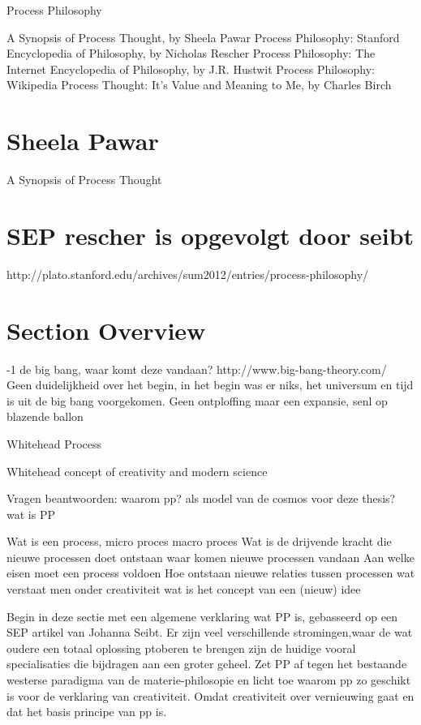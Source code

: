 \documentclass[a4paper]{Thesis}
\begin{document}
Process Philosophy

A Synopsis of Process Thought, by Sheela Pawar
Process Philosophy: Stanford Encyclopedia of Philosophy, by Nicholas Rescher
Process Philosophy: The Internet Encyclopedia of Philosophy, by J.R. Hustwit
Process Philosophy: Wikipedia
Process Thought: It's Value and Meaning to Me, by Charles Birch


\section{Sheela Pawar}
A Synopsis of Process Thought


\section{SEP rescher is opgevolgt door seibt}
http://plato.stanford.edu/archives/sum2012/entries/process-philosophy/

\section{Section Overview}

-1 de big bang, waar komt deze vandaan?
	http://www.big-bang-theory.com/
		Geen duidelijkheid over het begin, in het begin was er niks, het universum en tijd is uit de big bang voorgekomen.
		Geen ontploffing maar een expansie, senl op blazende ballon
	
Whitehead
	Process

Whitehead concept of creativity and modern science
 	



Vragen beantwoorden:
	waarom pp? als model van de cosmos voor deze thesis?
	wat is PP
	
	Wat is een process, micro proces macro proces
	Wat is de drijvende kracht die nieuwe processen doet ontstaan
	waar komen nieuwe processen vandaan
	Aan welke eisen moet een process voldoen
	Hoe ontstaan nieuwe relaties tussen processen
	wat verstaat men onder creativiteit
	wat is het concept van een (nieuw) idee

Begin in deze sectie met een algemene verklaring wat PP is, gebasseerd op een SEP artikel van Johanna Seibt. Er zijn veel verschillende stromingen,waar de wat oudere een totaal oplossing ptoberen te brengen zijn de huidige vooral specialisaties die bijdragen aan een groter geheel.
Zet PP af tegen het bestaande westerse paradigma van de materie-philosopie en licht toe waarom pp zo geschikt is voor de verklaring van creativiteit. Omdat creativiteit over vernieuwing gaat en dat het basis principe van pp is.
\end{document}
